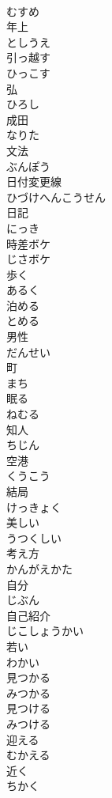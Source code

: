 \documentclass[8pt]{extreport}
\begin{document}
\begin{CJK}{UTF8}{min}
\\	むすめ
\\	年上	
\\	としうえ
\\	引っ越す	
\\	ひっこす
\\	弘	
\\	ひろし
\\	成田	
\\	なりた
\\	文法	
\\	ぶんぽう
\\	日付変更線	
\\	ひづけへんこうせん
\\	日記	
\\	にっき
\\	時差ボケ	
\\	じさボケ
\\	歩く	
\\	あるく
\\	泊める	
\\	とめる
\\	男性	
\\	だんせい
\\	町	
\\	まち
\\	眠る	
\\	ねむる
\\	知人	
\\	ちじん
\\	空港	
\\	くうこう
\\	結局	
\\	けっきょく
\\	美しい	
\\	うつくしい
\\	考え方	
\\	かんがえかた
\\	自分	
\\	じぶん
\\	自己紹介	
\\	じこしょうかい
\\	若い	
\\	わかい
\\	見つかる	
\\	みつかる
\\	見つける	
\\	みつける
\\	迎える	
\\	むかえる
\\	近く	
\\	ちかく

\end{CJK}
\end{document}
